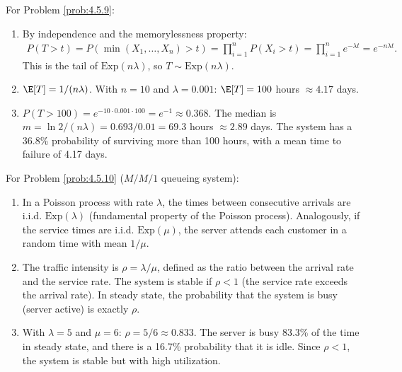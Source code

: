 \begin{solucion}
	\label{sol:4.5.9}
	For Problem \ref{prob:4.5.9}:
	\begin{enumerate}
		\item By independence and the memorylessness property:
		\begin{align*}
			P(T > t) = P(\min(X_1, \dots, X_n) > t) = \prod_{i=1}^{n} P(X_i > t) = \prod_{i=1}^{n} e^{-\lambda t} = e^{-n\lambda t}.
		\end{align*}
		This is the tail of $\text{Exp}(n\lambda)$, so $T \sim \text{Exp}(n\lambda)$.
		\item $\E[T] = 1/(n\lambda)$. With $n = 10$ and $\lambda = 0.001$: $\E[T] = 100$ hours $\approx 4.17$ days.
		\item $P(T > 100) = e^{-10 \cdot 0.001 \cdot 100} = e^{-1} \approx 0.368$. The median is $m = \ln 2 / (n\lambda) = 0.693/0.01 = 69.3$ hours $\approx 2.89$ days. The system has a 36.8\% probability of surviving more than 100 hours, with a mean time to failure of 4.17 days.
	\end{enumerate}
\end{solucion}

\begin{solucion}
	\label{sol:4.5.10}
	For Problem \ref{prob:4.5.10} ($M/M/1$ queueing system):
	\begin{enumerate}
		\item In a Poisson process with rate $\lambda$, the times between consecutive arrivals are i.i.d. $\text{Exp}(\lambda)$ (fundamental property of the Poisson process). Analogously, if the service times are i.i.d. $\text{Exp}(\mu)$, the server attends each customer in a random time with mean $1/\mu$.
		\item The traffic intensity is $\rho = \lambda/\mu$, defined as the ratio between the arrival rate and the service rate. The system is stable if $\rho < 1$ (the service rate exceeds the arrival rate). In steady state, the probability that the system is busy (server active) is exactly $\rho$.
		\item With $\lambda = 5$ and $\mu = 6$: $\rho = 5/6 \approx 0.833$. The server is busy 83.3\% of the time in steady state, and there is a 16.7\% probability that it is idle. Since $\rho < 1$, the system is stable but with high utilization. \quad \qedhere
	\end{enumerate}
\end{solucion}


